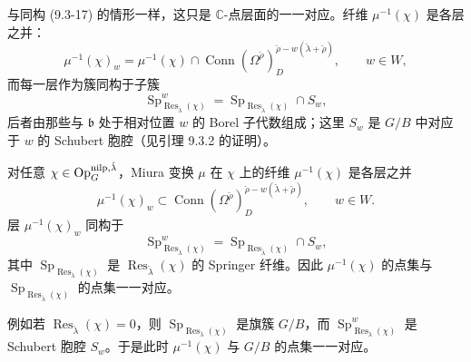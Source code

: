 %

与同构 (9.3-17) 的情形一样，这只是 $\mathbb{C}$-点层面的一一对应。纤维 $\mu^{-1}(\chi)$ 是各层之并：
\[
    \mu^{-1}(\chi)_w=\mu^{-1}(\chi)\cap\operatorname{Conn}(\Omega^{\check\rho})^{\check\rho-w(\check\lambda+\check\rho)}_D,
    \qquad w\in W,
\]
而每一层作为簇同构于子簇
\[
    \operatorname{Sp}^w_{\operatorname{Res}_{\check\lambda}(\chi)}
    =\operatorname{Sp}_{\operatorname{Res}_{\check\lambda}(\chi)}\cap S_w,
\]
后者由那些与 $\mathfrak{b}$ 处于相对位置 $w$ 的 Borel 子代数组成；这里 $S_w$ 是 $G/B$ 中对应于 $w$ 的 Schubert 胞腔（见引理 9.3.2 的证明）。

\begin{theorem}
    对任意 $\chi\in\operatorname{Op}^{\mathrm{nilp},\check\lambda}_G$，Miura 变换 $\mu$ 在 $\chi$ 上的纤维 $\mu^{-1}(\chi)$ 是各层之并
    \[
        \mu^{-1}(\chi)_w\subset\operatorname{Conn}(\Omega^{\check\rho})^{\check\rho-w(\check\lambda+\check\rho)}_D,
        \qquad w\in W.
    \]
    层 $\mu^{-1}(\chi)_w$ 同构于
    \[
        \operatorname{Sp}^w_{\operatorname{Res}_{\check\lambda}(\chi)}
        =\operatorname{Sp}_{\operatorname{Res}_{\check\lambda}(\chi)}\cap S_w,
    \]
    其中 $\operatorname{Sp}_{\operatorname{Res}_{\check\lambda}(\chi)}$ 是 $\operatorname{Res}_{\check\lambda}(\chi)$ 的 Springer 纤维。因此 $\mu^{-1}(\chi)$ 的点集与 $\operatorname{Sp}_{\operatorname{Res}_{\check\lambda}(\chi)}$ 的点集一一对应。
\end{theorem}

例如若 $\operatorname{Res}_{\check\lambda}(\chi)=0$，则 $\operatorname{Sp}_{\operatorname{Res}_{\check\lambda}(\chi)}$ 是旗簇 $G/B$，而 $\operatorname{Sp}^w_{\operatorname{Res}_{\check\lambda}(\chi)}$ 是 Schubert 胞腔 $S_w$。于是此时 $\mu^{-1}(\chi)$ 与 $G/B$ 的点集一一对应。

